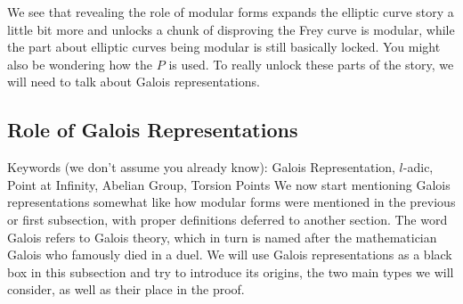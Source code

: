 \documentclass{article}
\theoremstyle{definition}
\theoremstyle{definition}
\theoremstyle{definition}
\begin{document}
We see that revealing the role of modular forms expands the elliptic curve story a little bit more and unlocks a chunk of disproving the Frey curve is modular, while the part about elliptic curves being modular is still basically locked. You might also be wondering how the $P$ is used. To really unlock these parts of the story, we will need to talk about Galois representations.

\subsection{Role of Galois Representations}

Keywords (we don't assume you already know): Galois Representation, $l$-adic, Point at Infinity, Abelian Group, Torsion Points
\newline\newline
We now start mentioning Galois representations somewhat like how modular forms were mentioned in the previous or first subsection, with proper definitions deferred to another section.
\newline \newline
The word Galois refers to Galois theory, which in turn is named after the mathematician Galois who famously died in a duel. We will use Galois representations as a black box in this subsection and try to introduce its origins, the two main types we will consider, as well as their place in the proof.


\end{document}

